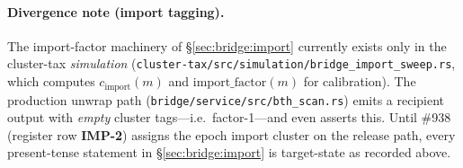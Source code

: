 \paragraph{Divergence note (import tagging).} The import-factor machinery of
\S\ref{sec:bridge:import} currently exists only in the cluster-tax
\emph{simulation} (\texttt{cluster-tax/src/simulation/bridge\_import\_sweep.rs},
which computes $c_{\mathrm{import}}(m)$ and $\mathrm{import\_factor}(m)$ for
calibration). The production unwrap path
(\texttt{bridge/service/src/bth\_scan.rs}) emits a recipient output with
\emph{empty} cluster tags---i.e.\ factor-1---and even asserts this. Until
\#938 (register row \textbf{IMP-2}) assigns the epoch import cluster on the
release path, every present-tense statement in \S\ref{sec:bridge:import} is
target-state as recorded above.
